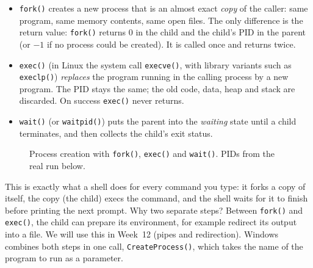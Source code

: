 \documentclass[11pt,a4paper]{article}
\newcommand{\cmd}[1]{\texttt{#1}}
\begin{document}
\begin{itemize}
  \item \cmd{fork()} creates a new process that is an almost exact \emph{copy} of the caller: same program, same memory contents, same open files. The only difference is the return value: \cmd{fork()} returns $0$ in the child and the child's PID in the parent (or $-1$ if no process could be created). It is called once and returns twice.
  \item \cmd{exec()} (in Linux the system call \cmd{execve()}, with library variants such as \cmd{execlp()}) \emph{replaces} the program running in the calling process by a new program. The PID stays the same; the old code, data, heap and stack are discarded. On success \cmd{exec()} never returns.
  \item \cmd{wait()} (or \cmd{waitpid()}) puts the parent into the \emph{waiting} state until a child terminates, and then collects the child's exit status.
\end{itemize}

\begin{figure}[H]
\centering
{}
\caption{Process creation with \cmd{fork()}, \cmd{exec()} and \cmd{wait()}. PIDs from the real run below.}
\end{figure}

This is exactly what a shell does for every command you type: it forks a copy of itself, the copy (the child) execs the command, and the shell waits for it to finish before printing the next prompt. Why two separate steps? Between \cmd{fork()} and \cmd{exec()}, the child can prepare its environment, for example redirect its output into a file. We will use this in Week~12 (pipes and redirection). Windows combines both steps in one call, \cmd{CreateProcess()}, which takes the name of the program to run as a parameter.
\end{document}
